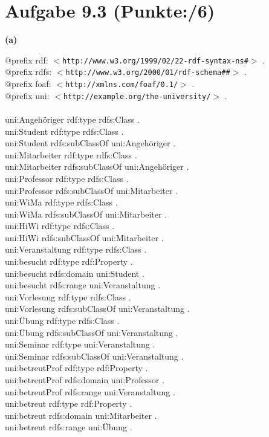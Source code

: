 \documentclass[11pt, a4paper]{article}
\newcommand{\blattnummer}{9}
\newcommand{\ppp}{6}
\newcommand{\aufgabe}[2] {\section*{Aufgabe \blattnummer.#1 (Punkte:\qquad/#2)}}
\newcommand{\aufgabenteil}[1] {\textbf{(#1)}}
\begin{document}
\aufgabe{3}{\ppp}
\aufgabenteil{a}
\begin{adjustwidth}{20pt}{20pt}
\begin{tt}
$@$prefix rdf: $<$\nolinkurl{http://www.w3.org/1999/02/22-rdf-syntax-ns#}$>$ .\\
$@$prefix rdfs: $<$\nolinkurl{http://www.w3.org/2000/01/rdf-schema##}$>$ .\\
$@$prefix foaf: $<$\nolinkurl{http://xmlns.com/foaf/0.1/}$>$ .\\
$@$prefix uni: $<$\nolinkurl{http://example.org/the-university/}$>$ .\\
\ \\
uni:Angehöriger rdf:type rdfs:Class . \\

uni:Student rdf:type rdfs:Class . \\
uni:Student rdfs:subClassOf uni:Angehöriger .\\
uni:Mitarbeiter rdf:type rdfs:Class .\\
uni:Mitarbeiter rdfs:subClassOf uni:Angehöriger .\\

uni:Professor rdf:type rdfs:Class .\\
uni:Professor rdfs:subClassOf uni:Mitarbeiter .\\
uni:WiMa rdf:type rdfs:Class .\\
uni:WiMa rdfs:subClassOf uni:Mitarbeiter .\\
uni:HiWi rdf:type rdfs:Class .\\
uni:HiWi rdfs:subClassOf uni:Mitarbeiter .\\

uni:Veranstaltung rdf:type rdfs:Class .\\

uni:besucht rdf:type rdf:Property .\\
uni:besucht rdfs:domain uni:Student .\\
uni:besucht rdfs:range uni:Veranstaltung .\\

uni:Vorlesung rdf:type rdfs:Class .\\
uni:Vorlesung rdfs:subClassOf uni:Veranstaltung .\\
uni:Übung rdf:type rdfs:Class .\\
uni:Übung rdfs:subClassOf uni:Veranstaltung .\\
uni:Seminar rdf:type uni:Veranstaltung .\\
uni:Seminar rdfs:subClassOf uni:Veranstaltung .\\

uni:betreutProf rdf:type rdf:Property .\\
uni:betreutProf rdfs:domain uni:Professor .\\
uni:betreutProf rdfs:range uni:Veranstaltung .\\

uni:betreut rdf:type rdf:Property .\\
uni:betreut rdfs:domain uni:Mitarbeiter .\\
uni:betreut rdfs:range uni:Übung .\\
\end{tt}
\end{adjustwidth}
\end{document}
